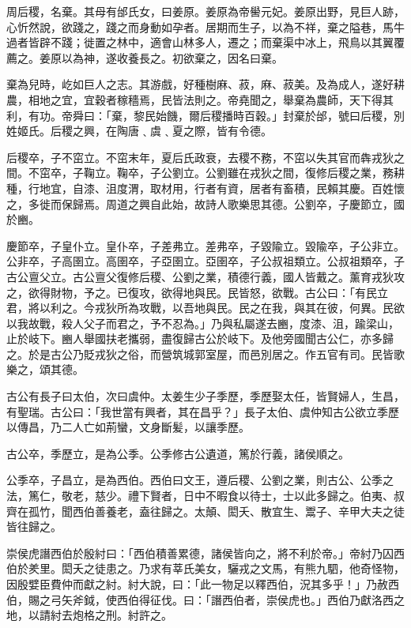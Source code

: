 
\begin{pinyinscope}
周后稷，名棄。其母有邰氏女，曰姜原。姜原為帝嚳元妃。姜原出野，見巨人跡，心忻然說，欲踐之，踐之而身動如孕者。居期而生子，以為不祥，棄之隘巷，馬牛過者皆辟不踐；徙置之林中，適會山林多人，遷之；而棄渠中冰上，飛鳥以其翼覆薦之。姜原以為神，遂收養長之。初欲棄之，因名曰棄。

棄為兒時，屹如巨人之志。其游戲，好種樹麻、菽，麻、菽美。及為成人，遂好耕農，相地之宜，宜穀者稼穡焉，民皆法則之。帝堯聞之，舉棄為農師，天下得其利，有功。帝舜曰：「棄，黎民始饑，爾后稷播時百穀。」封棄於邰，號曰后稷，別姓姬氏。后稷之興，在陶唐﹑虞﹑夏之際，皆有令德。

后稷卒，子不窋立。不窋末年，夏后氏政衰，去稷不務，不窋以失其官而犇戎狄之間。不窋卒，子鞠立。鞠卒，子公劉立。公劉雖在戎狄之間，復修后稷之業，務耕種，行地宜，自漆、沮度渭，取材用，行者有資，居者有畜積，民賴其慶。百姓懷之，多徙而保歸焉。周道之興自此始，故詩人歌樂思其德。公劉卒，子慶節立，國於豳。

慶節卒，子皇仆立。皇仆卒，子差弗立。差弗卒，子毀隃立。毀隃卒，子公非立。公非卒，子高圉立。高圉卒，子亞圉立。亞圉卒，子公叔祖類立。公叔祖類卒，子古公亶父立。古公亶父復修后稷、公劉之業，積德行義，國人皆戴之。薰育戎狄攻之，欲得財物，予之。已復攻，欲得地與民。民皆怒，欲戰。古公曰：「有民立君，將以利之。今戎狄所為攻戰，以吾地與民。民之在我，與其在彼，何異。民欲以我故戰，殺人父子而君之，予不忍為。」乃與私屬遂去豳，度漆、沮，踰梁山，止於岐下。豳人舉國扶老攜弱，盡復歸古公於岐下。及他旁國聞古公仁，亦多歸之。於是古公乃貶戎狄之俗，而營筑城郭室屋，而邑別居之。作五官有司。民皆歌樂之，頌其德。

古公有長子曰太伯，次曰虞仲。太姜生少子季歷，季歷娶太任，皆賢婦人，生昌，有聖瑞。古公曰：「我世當有興者，其在昌乎？」長子太伯、虞仲知古公欲立季歷以傳昌，乃二人亡如荊蠻，文身斷髪，以讓季歷。

古公卒，季歷立，是為公季。公季修古公遺道，篤於行義，諸侯順之。

公季卒，子昌立，是為西伯。西伯曰文王，遵后稷、公劉之業，則古公、公季之法，篤仁，敬老，慈少。禮下賢者，日中不暇食以待士，士以此多歸之。伯夷、叔齊在孤竹，聞西伯善養老，盍往歸之。太顛、閎夭、散宜生、鬻子、辛甲大夫之徒皆往歸之。

崇侯虎譖西伯於殷紂曰：「西伯積善累德，諸侯皆向之，將不利於帝。」帝紂乃囚西伯於羑里。閎夭之徒患之。乃求有莘氏美女，驪戎之文馬，有熊九駟，他奇怪物，因殷嬖臣費仲而獻之紂。紂大說，曰：「此一物足以釋西伯，況其多乎！」乃赦西伯，賜之弓矢斧鉞，使西伯得征伐。曰：「譖西伯者，崇侯虎也。」西伯乃獻洛西之地，以請紂去炮格之刑。紂許之。


\end{pinyinscope}
